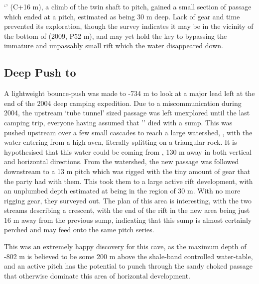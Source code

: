 `' (C+16 m), a climb of the twin shaft to
 pitch, gained a small section of passage which ended
at a pitch, estimated as being 30 m deep. Lack of gear and time
prevented its exploration, though the survey indicates it may be in the
vicinity of the bottom of  (2009, P52 m), and may yet
hold the key to bypassing the immature and unpassably small rift which
the  water disappeared down.

\subsection{Deep Push to }

A lightweight bounce-push was made to -734 m to look at a major lead
left at the end of the 2004 deep camping expedition. Due to a
miscommunication during 2004, the upstream `tube tunnel' sized passage
was left unexplored until the last camping trip, everyone having assumed
that '' died with a sump. This was pushed upstream over a few small
cascades to reach a large watershed, ,
with the water entering from a high aven, literally splitting on a
triangular rock. It is hypothesised that this water could be coming from
, 130 m away in both vertical and horizontal
directions. From the watershed, the new passage was followed downstream
to a 13 m pitch which was rigged with the tiny amount of gear that the
party had with them. This took them to a large active rift development,
with an unplumbed depth estimated at being in the region of 30 m. With
no more rigging gear, they surveyed out. The plan of this area is
interesting, with the two streams describing a crescent, with the end of
the rift in the new area being just 16 m away from the previous sump,
indicating that this sump is almost certainly perched and may feed onto
the same pitch series.

This was an extremely happy discovery for this cave, as the maximum
depth of -802 m is believed to be some 200 m above the shale-band
controlled water-table, and an active pitch has the potential to punch
through the sandy choked passage that otherwise dominate this area of
horizontal development.

